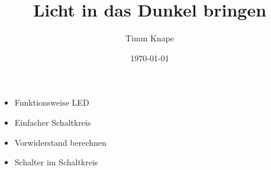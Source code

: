 \documentclass[a5paper,ngerman]{article}
\title{\color{emph}Licht in das Dunkel bringen}
\author{Timm Knape}
\date{\today}
\begin{document}
\pagecolor{background}
\color{normal}
\allsectionsfont{\color{emph}\mdseries}
\pagestyle{plain}
\maketitle
\thispagestyle{fancy}
\begin{multicols}{2}

\begin{itemize}
\item Funktionsweise LED
\item Einfacher Schaltkreis
\item Vorwiderstand berechnen
\item Schalter im Schaltkreis
\end{itemize}

\end{multicols}
\end{document}
